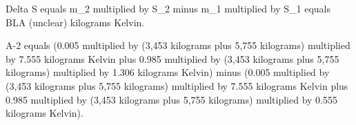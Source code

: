 Delta S equals m_2 multiplied by S_2 minus m_1 multiplied by S_1 equals BLA (unclear) kilograms Kelvin.  

A-2 equals (0.005 multiplied by (3,453 kilograms plus 5,755 kilograms) multiplied by 7.555 kilograms Kelvin plus 0.985 multiplied by (3,453 kilograms plus 5,755 kilograms) multiplied by 1.306 kilograms Kelvin) minus (0.005 multiplied by (3,453 kilograms plus 5,755 kilograms) multiplied by 7.555 kilograms Kelvin plus 0.985 multiplied by (3,453 kilograms plus 5,755 kilograms) multiplied by 0.555 kilograms Kelvin).